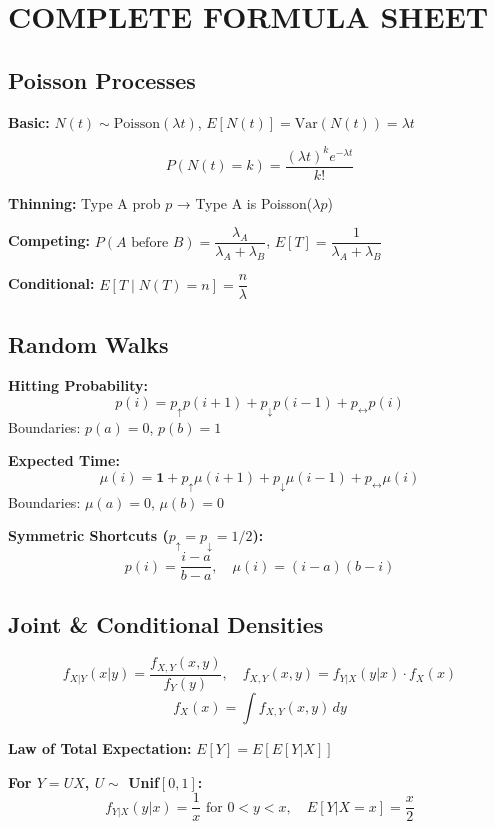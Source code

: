 \documentclass[10pt,letterpaper]{article}
\begin{document}
\newpage

\section{COMPLETE FORMULA SHEET}

\subsection{Poisson Processes}

\begin{tcolorbox}[colback=formulacolor!5,colframe=formulacolor]
\textbf{Basic:} $N(t) \sim \text{Poisson}(\lambda t)$, \quad $E[N(t)] = \text{Var}(N(t)) = \lambda t$

\[
P(N(t) = k) = \frac{(\lambda t)^k e^{-\lambda t}}{k!}
\]

\textbf{Thinning:} Type A prob $p$ → Type A is Poisson($\lambda p$)

\textbf{Competing:} $P(A \text{ before } B) = \dfrac{\lambda_A}{\lambda_A + \lambda_B}$, \quad $E[T] = \dfrac{1}{\lambda_A + \lambda_B}$

\textbf{Conditional:} $E[T \mid N(T) = n] = \dfrac{n}{\lambda}$
\end{tcolorbox}

\subsection{Random Walks}

\begin{tcolorbox}[colback=formulacolor!5,colframe=formulacolor]
\textbf{Hitting Probability:}
\[
p(i) = p_{\uparrow} p(i+1) + p_{\downarrow} p(i-1) + p_{\leftrightarrow} p(i)
\]
Boundaries: $p(a) = 0$, $p(b) = 1$

\textbf{Expected Time:}
\[
\mu(i) = \mathbf{1} + p_{\uparrow} \mu(i+1) + p_{\downarrow} \mu(i-1) + p_{\leftrightarrow} \mu(i)
\]
Boundaries: $\mu(a) = 0$, $\mu(b) = 0$

\textbf{Symmetric Shortcuts ($p_{\uparrow} = p_{\downarrow} = 1/2$):}
\[
p(i) = \frac{i-a}{b-a}, \quad \mu(i) = (i-a)(b-i)
\]
\end{tcolorbox}

\subsection{Joint \& Conditional Densities}

\begin{tcolorbox}[colback=formulacolor!5,colframe=formulacolor]
\[
f_{X|Y}(x|y) = \frac{f_{X,Y}(x,y)}{f_Y(y)}, \quad f_{X,Y}(x,y) = f_{Y|X}(y|x) \cdot f_X(x)
\]
\[
f_X(x) = \int f_{X,Y}(x,y) \, dy
\]

\textbf{Law of Total Expectation:} $E[Y] = E[E[Y|X]]$

\textbf{For $Y = UX$, $U \sim$ Unif$[0,1]$:}
\[
f_{Y|X}(y|x) = \frac{1}{x} \text{ for } 0 < y < x, \quad E[Y|X=x] = \frac{x}{2}
\]
\end{tcolorbox}
\end{document}
